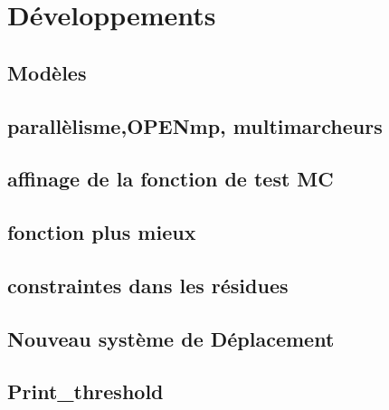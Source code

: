 \chapter{Développements}
\label{chap:developpements}

\section{Modèles}

\section{parallèlisme,OPENmp, multimarcheurs}

\section{affinage de la fonction de test MC}
\section{fonction plus mieux}
\section{constraintes dans les résidues}
\section{Nouveau système de Déplacement}
\section{Print\_threshold}

\clearpage


